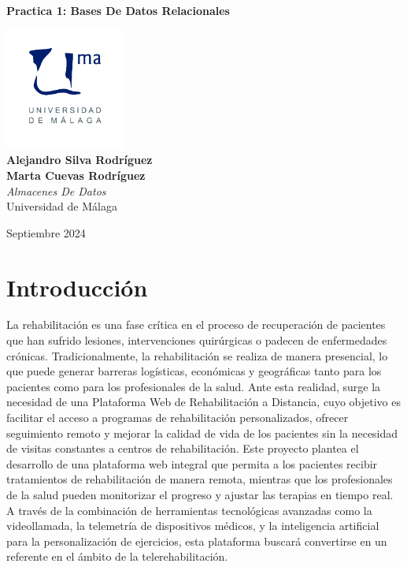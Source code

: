 \documentclass{article}
\begin{document}
\begin{titlepage}
	\centering
	\vspace*{3cm}
	
	{\Huge \textbf{Practica 1: Bases De Datos Relacionales}\\[0.5cm]}
	
	\vspace{2cm}
	\includegraphics[width=0.3\textwidth]{images/uma_logo.jpg}\\[1cm]
	
	{\LARGE \textbf{Alejandro Silva Rodríguez}\\[0.5cm]}
	{\LARGE \textbf{Marta Cuevas Rodríguez}\\[0.5cm]}
	{\large \textit{Almacenes De Datos}\\
		Universidad de Málaga\\
		}
	
	\vfill
	
	{\large Septiembre 2024}
\end{titlepage}

\tableofcontents

\newpage

\section{Introducción}
La rehabilitación es una fase crítica en el proceso de recuperación de pacientes que han
sufrido lesiones, intervenciones quirúrgicas o padecen de enfermedades crónicas.
Tradicionalmente, la rehabilitación se realiza de manera presencial, lo que puede generar
barreras logísticas, económicas y geográficas tanto para los pacientes como para los
profesionales de la salud. Ante esta realidad, surge la necesidad de una Plataforma Web de
Rehabilitación a Distancia, cuyo objetivo es facilitar el acceso a programas de rehabilitación
personalizados, ofrecer seguimiento remoto y mejorar la calidad de vida de los pacientes sin
la necesidad de visitas constantes a centros de rehabilitación.
Este proyecto plantea el desarrollo de una plataforma web integral que permita a los
pacientes recibir tratamientos de rehabilitación de manera remota, mientras que los
profesionales de la salud pueden monitorizar el progreso y ajustar las terapias en tiempo real.
A través de la combinación de herramientas tecnológicas avanzadas como la videollamada,
la telemetría de dispositivos médicos, y la inteligencia artificial para la personalización de
ejercicios, esta plataforma buscará convertirse en un referente en el ámbito de la telerehabilitación.
\end{document}
